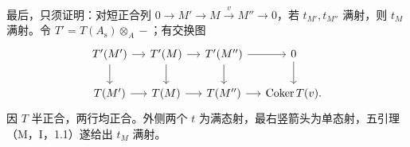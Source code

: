 最后，只须证明：对短正合列 $0\to M'\to M\xrightarrow{v}M''\to0$，若 $t_{M'},t_{M''}$ 满射，则 $t_M$ 满射。令 $T'=T(A_{\mathrm s})\otimes_A-$；有交换图
\[
 \begin{tikzcd}[column sep=small]
 T'(M')\arrow[r]\arrow[d]&T'(M)\arrow[r]\arrow[d]&T'(M'')\arrow[r]\arrow[d]&0\arrow[d]\\
 T(M')\arrow[r]&T(M)\arrow[r]&T(M'')\arrow[r]&\Coker T(v).
 \end{tikzcd}
\]
因 $T$ 半正合，两行均正合。外侧两个 $t$ 为满态射，最右竖箭头为单态射，五引理（M，I，1.1）遂给出 $t_M$ 满射。
